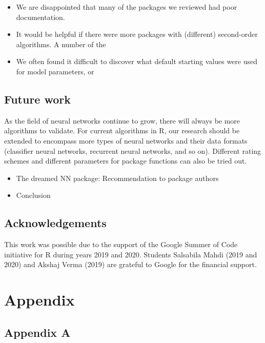 \begin{itemize}
\tightlist
\item
  We are disappointed that many of the packages we reviewed had poor
  documentation.
\item
  It would be helpful if there were more packages with (different)
  second-order algorithms. A number of the
\item
  We often found it difficult to discover what default starting values
  were used for model parameters, or
\end{itemize}

\hypertarget{future-work}{%
\subsection{Future work}\label{future-work}}

As the field of neural networks continue to grow, there will always be
more algorithms to validate. For current algorithms in \textsf{R}, our
research should be extended to encompass more types of neural networks
and their data formats (classifier neural networks, recurrent neural
networks, and so on). Different rating schemes and different parameters
for package functions can also be tried out.

\begin{itemize}
\tightlist
\item
  The dreamed NN package: Recommendation to package authors
\item
  Conclusion
\end{itemize}

\hypertarget{acknowledgements}{%
\subsection{Acknowledgements}\label{acknowledgements}}

This work was possible due to the support of the Google Summer of Code
initiative for R during years 2019 and 2020. Students Salsabila Mahdi
(2019 and 2020) and Akshaj Verma (2019) are grateful to Google for the
financial support.



\hypertarget{appendix}{%
\section{Appendix}\label{appendix}}

\hypertarget{appendix-a}{%
\subsection{Appendix A}\label{appendix-a}}


